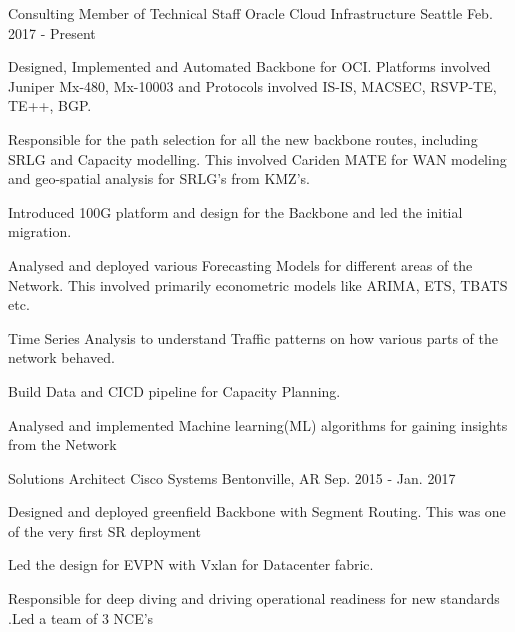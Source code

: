 

\begin{cventries}

  \cventry
    {Consulting Member of Technical Staff} %
    {Oracle Cloud Infrastructure} %
    {Seattle} %
    {Feb. 2017 - Present} %
    {
      \begin{cvitems} %
        \item {Designed, Implemented and Automated Backbone for OCI. Platforms involved Juniper Mx-480, Mx-10003 and Protocols involved IS-IS, MACSEC, RSVP-TE, TE++, BGP.}
        \item {Responsible for the path selection for all the new backbone routes, including SRLG and Capacity modelling. This involved Cariden MATE for WAN modeling and geo-spatial analysis for SRLG's from KMZ's.}
        \item {Introduced 100G platform and design for the Backbone and led the initial migration.}
        \item {Analysed and deployed various Forecasting Models for different areas of the Network. This involved primarily econometric models like ARIMA, ETS, TBATS etc.}
        \item {Time Series Analysis to understand Traffic patterns on how various parts of the network behaved.}
        \item {Build Data and CICD pipeline for Capacity Planning.}
        \item {Analysed and implemented Machine learning(ML) algorithms for gaining insights from the Network}
      \end{cvitems}
    }

  \cventry
    {Solutions Architect} %
    {Cisco Systems} %
    {Bentonville, AR} %
    {Sep. 2015 - Jan. 2017} %
    {
      \begin{cvitems} %
        \item {Designed and deployed greenfield Backbone with Segment Routing. This was one of the very first SR deployment}
        \item {Led the design for EVPN with Vxlan for Datacenter fabric.}
        \item {Responsible for deep diving and driving operational readiness for new standards .Led a team of 3 NCE's}
      \end{cvitems}
    }


\end{cventries}
